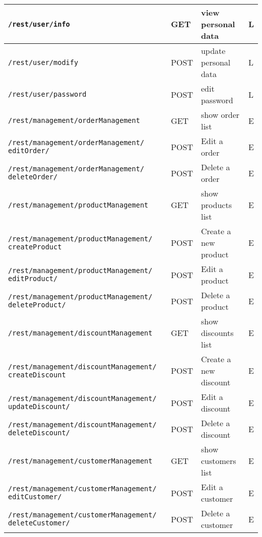 \begin{longtable}{|p{}|p{} |p{}|p{}|}

\texttt{/rest/user/info} & GET & view personal data & L \\\hline
\texttt{/rest/user/modify} & POST & update personal data & L\\\hline
\texttt{/rest/user/password} & POST & edit password & L\\\hline


\texttt{/rest/management/orderManagement} & GET & show order list & E\\\hline
\texttt{/rest/management/orderManagement/} \texttt{editOrder/} & POST & Edit a order & E\\\hline
\texttt{/rest/management/orderManagement/} \texttt{deleteOrder/} &  POST & Delete a order & E\\\hline


\texttt{/rest/management/productManagement} & GET & show products list & E\\\hline
\texttt{/rest/management/productManagement/} \texttt{createProduct} & POST & Create a new product & E\\\hline
\texttt{/rest/management/productManagement/} \texttt{editProduct/} & POST & Edit a product & E\\\hline
\texttt{/rest/management/productManagement/} \texttt{deleteProduct/} & POST & Delete a product & E\\\hline


\texttt{/rest/management/discountManagement} & GET & show discounts list & E\\\hline
\texttt{/rest/management/discountManagement/} \texttt{createDiscount} & POST & Create a new discount & E\\\hline
\texttt{/rest/management/discountManagement/} \texttt{updateDiscount/}& POST & Edit a discount & E\\\hline
\texttt{/rest/management/discountManagement/} \texttt{deleteDiscount/} & POST & Delete a discount & E\\\hline


\texttt{/rest/management/customerManagement} & GET & show customers list & E\\\hline
\texttt{/rest/management/customerManagement/} \texttt{editCustomer/}& POST & Edit a customer & E\\\hline
\texttt{/rest/management/customerManagement/} \texttt{deleteCustomer/}& POST & Delete a customer & E\\\hline


\end{longtable}
